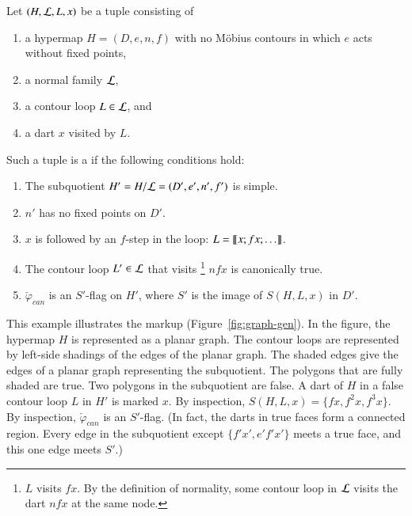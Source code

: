 \begin{definition}\label{def:marked}
Let $(H,{\cal L},L,x)$ be a tuple consisting of 
\begin{enumerate}
\item a hypermap $H=(D,e,n,f)$ with no M\"obius contours  in which
  $e$ acts without fixed points,  %
\item a normal family ${\cal L}$, 
\item a contour loop $L\in{\cal L}$, and
\item a dart $x$ visited by $L$.
\end{enumerate}
Such a tuple is a  if
the following conditions hold:
\begin{enumerate}
\item The subquotient $H'=H/{\cal L} = (D',e',n',f')$ is simple.  
\item $n'$ has no fixed points on $D'$.
\item $x$ is followed by an $f$-step in the loop: $L = {\llbracket{x;fx;\ldots}\rrbracket}$.
\item The contour loop $L'\in {\cal L}$ that visits%
\footnote{$L$ visits  $f x$.  By the definition of normality, some contour loop in
${\cal L}$ visits the dart $n f x$ at the same node.} 
$n f x$ is canonically true.
\item 
  $\check\varphi_{can}$ is an $S'$-flag on $H'$, where $S'$ is the image of 
  $S(H,L,x)$ in $D'$.  %
\end{enumerate}
\end{definition}


\begin{example}[illustration]\label{ex:graph-gen}  
  This example illustrates the markup (Figure~\ref{fig:graph-gen}).
  In the figure, the hypermap $H$ is represented as a planar graph.
  The contour loops are represented by left-side shadings of the edges
  of the planar graph.  The shaded edges give the edges of a planar
  graph representing the subquotient.  The polygons that are fully shaded
  are true.  Two polygons in the subquotient are false.  A dart of $H$ in
  a false contour loop $L$ in $H'$ is marked $x$.  By inspection,
  $S(H,L,x)=\{f x,f^2 x,f^3 x\}$.  By inspection,
  $\check\varphi_{can}$ is an $S'$-flag.  (In fact, the darts in true
  faces form a connected region.  Every edge in the subquotient except
  $\{f' x', e' f' x'\}$ meets a true face, and this one edge meets
  $S'$.)
\end{example}


